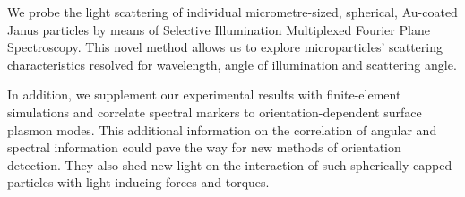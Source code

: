 We probe the light scattering of individual micrometre-sized, spherical, Au-coated Janus particles by means of Selective Illumination Multiplexed Fourier Plane Spectroscopy. 
This novel method allows us to explore microparticles' scattering characteristics resolved for wavelength, angle of illumination and scattering angle. 

In addition, we supplement our experimental results with finite-element simulations and correlate spectral markers to orientation-dependent surface plasmon modes. 
This additional information on the correlation of angular and spectral information could pave the way for new methods of orientation detection. They also shed new light on the interaction of such spherically capped particles with light inducing forces and torques. \cite{Ilic2017, BA}
